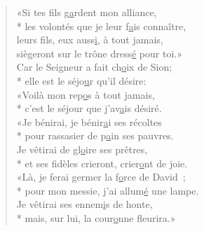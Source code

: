 \begin{verse}
«Si tes fils g\underline{a}rdent mon alliance, \\*
les volontés que je leur f\underline{a}is connaître, \\
leurs fils, eux auss\underline{i}, à tout jamais, \\
siègeront sur le trône dress\underline{é} pour toi.» \\

Car le Seigneur a fait ch\underline{o}ix de Sion; \\*
elle est le séjo\underline{u}r qu’il désire: \\
«Voilà mon rep\underline{o}s à tout jamais, \\*
c’est le séjour que j’av\underline{a}is désiré. \\

«Je bénirai, je bénir\underline{a}i ses récoltes \\*
pour rassasier de p\underline{a}in ses pauvres. \\
Je vêtirai de gl\underline{o}ire ses prêtres, \\*
et ses fidèles crieront, crier\underline{o}nt de joie. \\

«Là, je ferai germer la f\underline{o}rce de David ; \\*
pour mon messie, j’ai allum\underline{é} une lampe. \\
Je vêtirai ses ennem\underline{i}s de honte, \\*
mais, sur lui, la cour\underline{o}nne fleurira.» \\
\end{verse}

